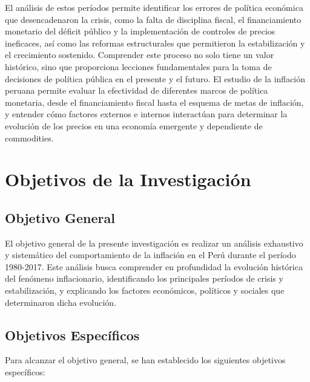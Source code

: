 \documentclass[
  stu,
  floatsintext,
  longtable,
  a4paper,
  nolmodern,
  notxfonts,
  notimes,
  12pt,
  colorlinks=true,linkcolor=blue,citecolor=blue,urlcolor=blue]{apa7}
\begin{document}
El análisis de estos períodos permite identificar los errores de
política económica que desencadenaron la crisis, como la falta de
disciplina fiscal, el financiamiento monetario del déficit público y la
implementación de controles de precios ineficaces, así como las reformas
estructurales que permitieron la estabilización y el crecimiento
sostenido. Comprender este proceso no solo tiene un valor histórico,
sino que proporciona lecciones fundamentales para la toma de decisiones
de política pública en el presente y el futuro. El estudio de la
inflación peruana permite evaluar la efectividad de diferentes marcos de
política monetaria, desde el financiamiento fiscal hasta el esquema de
metas de inflación, y entender cómo factores externos e internos
interactúan para determinar la evolución de los precios en una economía
emergente y dependiente de commodities.

\section{Objetivos de la
Investigación}\label{objetivos-de-la-investigaciuxf3n}

\subsection{Objetivo General}\label{objetivo-general}

El objetivo general de la presente investigación es realizar un análisis
exhaustivo y sistemático del comportamiento de la inflación en el Perú
durante el período 1980-2017. Este análisis busca comprender en
profundidad la evolución histórica del fenómeno inflacionario,
identificando los principales períodos de crisis y estabilización, y
explicando los factores económicos, políticos y sociales que
determinaron dicha evolución.

\subsection{Objetivos Específicos}\label{objetivos-especuxedficos}

Para alcanzar el objetivo general, se han establecido los siguientes
objetivos específicos:
\end{document}
